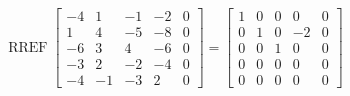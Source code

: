 \begin{exerciseAnswer} 


\[\operatorname{RREF} \left[\begin{array}{cccc|c}
-4 & 1 & -1 & -2 & 0 \\
1 & 4 & -5 & -8 & 0 \\
-6 & 3 & 4 & -6 & 0 \\
-3 & 2 & -2 & -4 & 0 \\
-4 & -1 & -3 & 2 & 0
\end{array}\right] = \left[\begin{array}{cccc|c}
1 & 0 & 0 & 0 & 0 \\
0 & 1 & 0 & -2 & 0 \\
0 & 0 & 1 & 0 & 0 \\
0 & 0 & 0 & 0 & 0 \\
0 & 0 & 0 & 0 & 0
\end{array}\right] \]



\end{exerciseAnswer}
